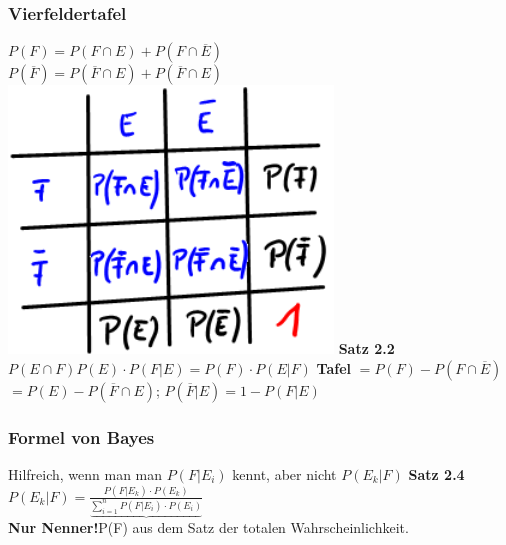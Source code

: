   	\subsubsection{Vierfeldertafel}
  	$P(F) = P(F \cap E ) + P(F \cap \overline{E})$\\
  	$P(\overline {F}) = P(\overline{F} \cap E) + P(\overline{F} \cap E)$\\
  	\includegraphics[scale=0.25]{./pic/Vierfeldertafel}
  	\textbf{Satz 2.2}
  	$P(E \cap F)  P(E) \cdot P(F|E) = P(F) \cdot P(E|F) $
  	\textbf{Tafel}
  	$= P(F) - P(F \cap \overline{E})$
  	$ = P(E) - P(\overline{F} \cap E)$; 
  $P(\overline{F} | E) = 1 - P(F | E)$
  \subsubsection{Formel von Bayes}
  Hilfreich, wenn man man $P( F | E_{i} )$ kennt, aber nicht $P(E_{k}|F)$
  \textbf{Satz 2.4}
  $P(E_{k} | F) = \frac{ P(F | E_{k}) \cdot P(E_{k})}{ \underbrace{\sum_{i=1}^{n}P(F|E_{i}) \cdot P(E_{i})}}$\\
\textbf{Nur Nenner!}P(F) aus dem Satz der totalen Wahrscheinlichkeit.

